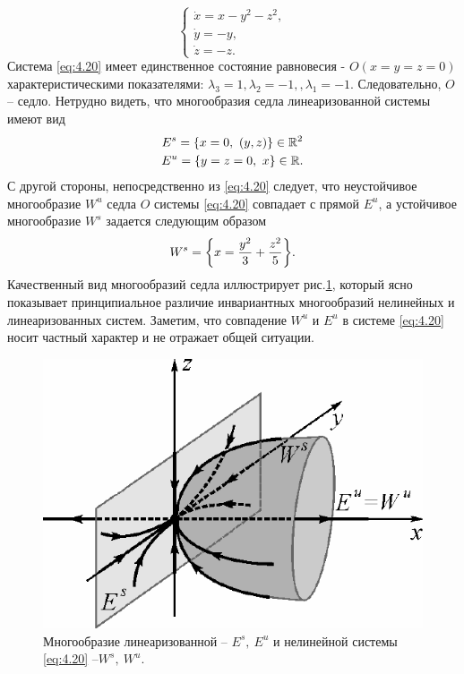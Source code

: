 \begin{equation}
        \label{eq:4.20}
        \begin{cases}
                \dot x = x - y^2 - z^2, \\
                \dot y = - y, \\
                \dot z = - z.
        \end{cases}
\end{equation}
Система \eqref{eq:4.20} имеет единственное состояние равновесия - $O(x=y=z=0)$  характеристическими показателями: $\lambda_3=1, \lambda_2=-1,, \lambda_1=-1$. Следовательно, $O$ -- седло. Нетрудно видеть, что многообразия седла линеаризованной системы имеют вид
\begin{gather}
        E^s = \qty{ x=0, ~ (y,z)} \in \mathbb{R}^2\\
                E^{u} = \qty{ y =z =0 ,~ x} \in \mathbb{R}.
\end{gather}
С другой стороны, непосредственно из \eqref{eq:4.20} следует, что неустойчивое многообразие $W^u$ седла $O$ системы \eqref{eq:4.20} совпадает с прямой $E^u$, а устойчивое многообразие $W^s$ задается следующим образом
\begin{equation}
        \label{eq:}
        W^s = \qty{ x = \frac{y^2}{3} + \frac{z^2}{5} }.
\end{equation}
Качественный вид многообразий седла иллюстрирует рис.\ref{fig:4.6}, который ясно показывает принципиальное 
различие инвариантных многообразий нелинейных и линеаризованных систем. Заметим, что совпадение $W^u$ и $E^u$ в системе \eqref{eq:4.20} носит частный характер и не отражает общей ситуации. 

\begin{figure}[h!]
        \centering
        \includegraphics[width=0.6\linewidth]{fig/lect4/6}
        \caption{Многообразие линеаризованной -- $E^s,~E^u$ и нелинейной системы \eqref{eq:4.20} --$W^s,~ W^u$.}
        \label{fig:4.6}
\end{figure}

